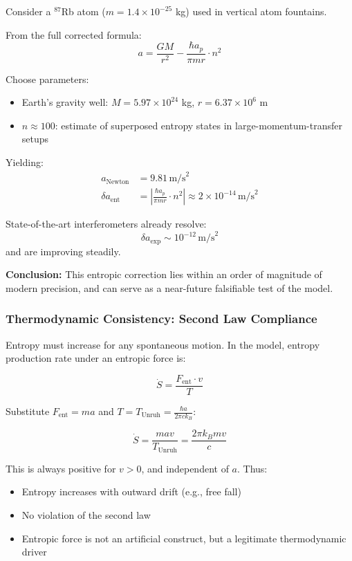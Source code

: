 \documentclass[12pt]{article}
\begin{document}
Consider a $^{87}$Rb atom ($m = 1.4 \times 10^{-25}$ kg) used in vertical atom fountains.

From the full corrected formula:
\[
a = \frac{G M}{r^2} - \frac{\hbar a_p}{\pi m r} \cdot n^2
\]

Choose parameters:
\begin{itemize}
    \item Earth's gravity well: $M = 5.97 \times 10^{24}$ kg, $r = 6.37 \times 10^6$ m
    \item $n \approx 100$: estimate of superposed entropy states in large-momentum-transfer setups
\end{itemize}

Yielding:
\begin{align*}
a_{\text{Newton}} &= 9.81 \, \text{m/s}^2 \\
\delta a_{\text{ent}} &= \left| \frac{\hbar a_p}{\pi m r} \cdot n^2 \right| \approx 2 \times 10^{-14} \, \text{m/s}^2
\end{align*}

State-of-the-art interferometers already resolve:
\[
\delta a_{\text{exp}} \sim 10^{-12} \, \text{m/s}^2
\]
and are improving steadily.

\noindent
\textbf{Conclusion:} This entropic correction lies within an order of magnitude of modern precision, and can serve as a near-future falsifiable test of the model.

\subsubsection*{Thermodynamic Consistency: Second Law Compliance}

Entropy must increase for any spontaneous motion. In the model, entropy production rate under an entropic force is:

\[
\dot{S} = \frac{F_{\text{ent}} \cdot v}{T}
\]

Substitute $F_{\text{ent}} = m a$ and $T = T_{\text{Unruh}} = \frac{\hbar a}{2\pi c k_B}$:

\[
\dot{S} = \frac{m a v}{T_{\text{Unruh}}} = \frac{2\pi k_B m v}{c}
\]

This is always positive for $v > 0$, and independent of $a$. Thus:

\begin{itemize}
    \item Entropy increases with outward drift (e.g., free fall)
    \item No violation of the second law
    \item Entropic force is not an artificial construct, but a legitimate thermodynamic driver
\end{itemize}
\end{document}
